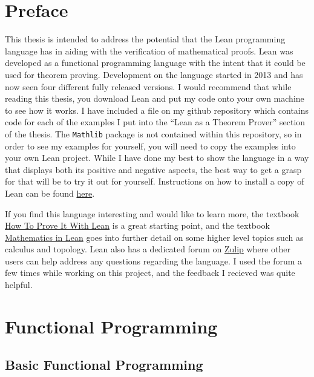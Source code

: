 \documentclass[
  letterpaper,
]{scrreprt}
\theoremstyle{remark}
\begin{document}
\hypertarget{preface}{%
\chapter*{Preface}\label{preface}}


This thesis is intended to address the potential that the Lean
programming language has in aiding with the verification of mathematical
proofs. Lean was developed as a functional programming language with the
intent that it could be used for theorem proving. Development on the
language started in 2013 and has now seen four different fully released
versions. I would recommend that while reading this thesis, you download
Lean and put my code onto your own machine to see how it works. I have
included a file on my github repository which contains code for each of
the examples I put into the ``Lean as a Theorem Prover'' section of the
thesis. The \texttt{Mathlib} package is not contained within this
repository, so in order to see my examples for yourself, you will need
to copy the examples into your own Lean project. While I have done my
best to show the language in a way that displays both its positive and
negative aspects, the best way to get a grasp for that will be to try it
out for yourself. Instructions on how to install a copy of Lean can be
found \href{https://lean-lang.org/lean4/doc/quickstart.html}{here}.

If you find this language interesting and would like to learn more, the
textbook \href{https://djvelleman.github.io/HTPIwL/}{How To Prove It
With Lean} is a great starting point, and the textbook
\href{https://leanprover-community.github.io/mathematics_in_lean/index.html}{Mathematics
in Lean} goes into further detail on some higher level topics such as
calculus and topology. Lean also has a dedicated forum on
\href{https://leanprover.zulipchat.com}{Zulip} where other users can
help address any questions regarding the language. I used the forum a
few times while working on this project, and the feedback I recieved was
quite helpful.


\hypertarget{functional-programming}{%
\chapter{Functional Programming}\label{functional-programming}}

\hypertarget{basic-functional-programming}{%
\section{Basic Functional
Programming}\label{basic-functional-programming}}
\end{document}
